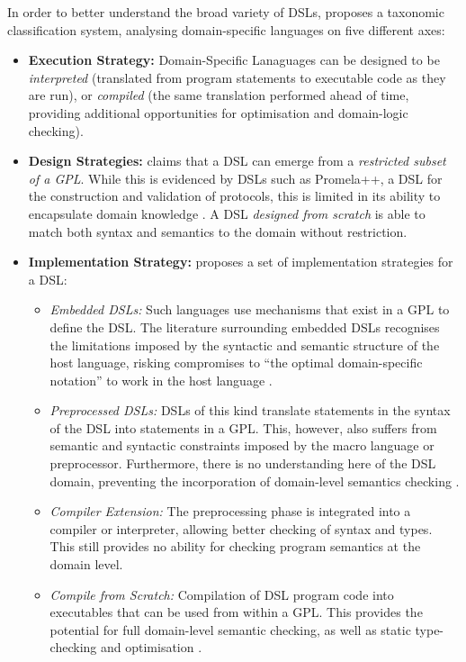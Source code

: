 In order to better understand the broad variety of DSLs, \citet{van2000domain} proposes a taxonomic classification system, analysing domain-specific languages on five different axes:
\begin{itemize}
    \item \textbf{Execution Strategy:} Domain-Specific Lanaguages can be designed to be \textit{interpreted} (translated from program statements to executable code as they are run), or \textit{compiled} (the same translation performed ahead of time, providing additional opportunities for optimisation and domain-logic checking).
    \item \textbf{Design Strategies:} \citet{van2000domain} claims that a DSL can emerge from a \textit{restricted subset of a GPL}. 
    While this is evidenced by DSLs such as Promela++, a DSL for the construction and validation of protocols, this is limited in its ability to encapsulate domain knowledge \citep{basu1997language}.
    A DSL \textit{designed from scratch} is able to match both syntax and semantics to the domain without restriction. 
    \item \textbf{Implementation Strategy:} \citet{van2000domain} proposes a set of implementation strategies for a DSL:
    \begin{itemize}
        \item \textit{Embedded DSLs:} Such languages use mechanisms that exist in a GPL to define the DSL. 
        The literature surrounding embedded DSLs recognises the limitations imposed by the syntactic and semantic structure of the host language, risking compromises to ``the optimal domain-specific notation'' to work in the host language \citep[pg. 3]{van2000domain}.
        \item \textit{Preprocessed DSLs:} DSLs of this kind translate statements in the syntax of the DSL into statements in a GPL. 
        This, however, also suffers from semantic and syntactic constraints imposed by the macro language or preprocessor. 
        Furthermore, there is no understanding here of the DSL domain, preventing the incorporation of domain-level semantics checking \citep{van2000domain}.
        \item \textit{Compiler Extension:} The preprocessing phase is integrated into a compiler or interpreter, allowing better checking of syntax and types.
        This still provides no ability for checking program semantics at the domain level. 
        \item \textit{Compile from Scratch:} Compilation of DSL program code into executables that can be used from within a GPL. 
        This provides the potential for full domain-level semantic checking, as well as static type-checking and optimisation \citep{van2000domain}.
    \end{itemize}
\end{itemize}

